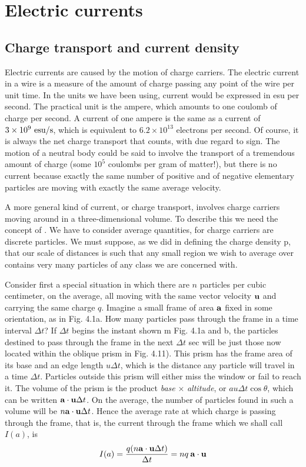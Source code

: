\chapter{Electric currents}

\section{Charge transport and current density}

Electric currents are caused by the motion of charge carriers. The
electric current in a wire is a measure of the amount of charge passing
any point of the wire per unit time. In the units we have been
using, current would be expressed in esu per second. The practical
unit is the ampere, which amounts to one coulomb of charge per
second. A current of one ampere is the same as a current of
$3 \times 10^9\ \textup{esu}/\textup{s}$, which is equivalent to $6.2 \times 10^{13}$ electrons per
second. Of course, it is always the net charge transport that counts,
with due regard to sign. The motion of a neutral body could be said
to involve the transport of a tremendous amount of charge (some
$10^5$ coulombs per gram of matter!), but there is no current because
exactly the same number of positive and of negative elementary
particles are moving with exactly the same average velocity.

A more general kind of current, or charge transport, involves
charge carriers moving around in a three-dimensional volume. To
describe this we need the concept of . We have to
consider average quantities, for charge carriers are discrete particles.
We must suppose, as we did in defining the charge density p, that
our scale of distances is such that any small region we wish to average
over contains very many particles of any class we are concerned
with.

Consider first a special situation in which there are $n$ particles
per cubic centimeter, on the average, all moving with the same vector
velocity $\mathbf{u}$ and carrying the same charge $q$. Imagine a small frame
of area $\mathbf{a}$ fixed in some orientation, as in Fig. 4.1a. How many particles
pass through the frame in a time interval $\Delta t$? If $\Delta t$ begins the
instant shown m Fig. 4.1a and b, the particles destined to pass
through the frame in the next $\Delta t$ sec will be just those now located
within the oblique prism in Fig. 4.11). This prism has the frame area
of its base and an edge length $u \Delta t$, which is the distance any particle
will travel in a time $\Delta t$. Particles outside this prism will either miss
the window or fail to reach it. The volume of the prism is the product
\emph{base} $\times$ \emph{altitude}, or $au \Delta t \cos \theta$, which can be written
$\mathbf{a}\cdot\mathbf{u} \Delta t$. On
the average, the number of particles found in such a volume will be
$n\mathbf{a}\cdot\mathbf{u} \Delta t$. Hence the average rate at which charge is passing through
the frame, that is, the current through the frame which we shall call
$I(a)$, is
\begin{equation}
  I(a) = \frac{q(n\mathbf{a}\cdot\mathbf{u} \Delta t)}{\Delta t} = nq\:\mathbf{a}\cdot\mathbf{u}
\end{equation}

